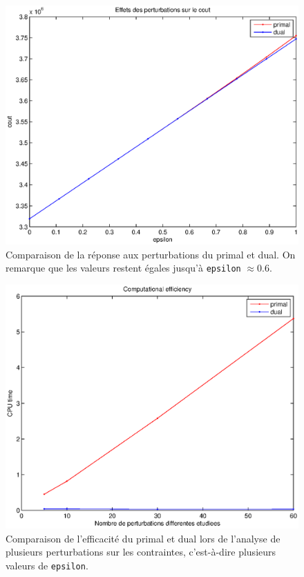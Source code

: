 \begin{figure}
  \begin{center}
    \includegraphics[scale=0.6]{img/responseToPerturbations.eps}
    \caption{Comparaison de la réponse aux perturbations du primal
    et dual. On remarque que les valeurs restent égales jusqu'à \texttt{epsilon} $\approx 0.6$.}
    \label{fig:responseToPerturbations}
  \end{center}
\end{figure}

\begin{figure}
  \begin{center}
    \includegraphics[scale=0.6]{img/efficiencyDual.eps}
    \caption{Comparaison de l'efficacité du primal et dual lors de
    l'analyse de plusieurs perturbations sur les contraintes, c'est-à-dire plusieurs valeurs de \texttt{epsilon}.}
    \label{fig:efficiencyDual}
  \end{center}
\end{figure}

